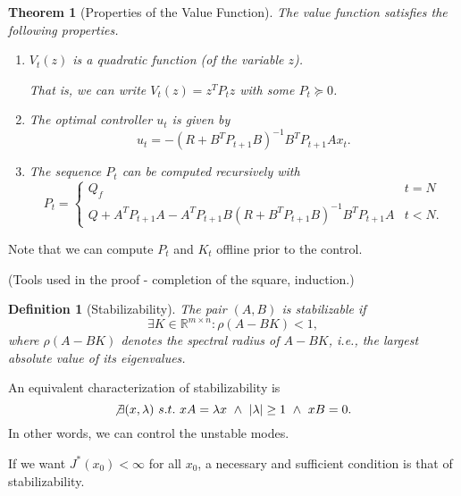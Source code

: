 \documentclass[a4 paper]{article}
\numberwithin{equation}{section}
\theoremstyle{boldStyle}
\theoremstyle{boldBlueStyle}
\theoremstyle{boldPurpleStyle}
\newtheorem{theorem}{Theorem}[section]
\theoremstyle{boldRedStyle}
\newtheorem{definition}{Definition}[section]
\theoremstyle{boldGreenStyle}
\begin{document}
\begin{theorem}[Properties of the Value Function]
The value function satisfies the following properties.
\begin{enumerate}
    \item \( V_t(z) \) is a quadratic function (of the variable \( z \)). 
    
    That is, we can write \( V_t(z) = z^T P_t z \) with some \( P_t \succeq 0 \).
    
    \item The optimal controller \( u_t \) is given by
    \[
    u_t = -(R + B^T P_{t+1} B)^{-1} B^T P_{t+1} A x_t.
    \]
    \item The sequence \( P_t \) can be computed recursively with
    \[
    P_t = 
    \begin{cases} 
    Q_f & t = N \\
    Q + A^T P_{t+1} A - A^T P_{t+1} B (R + B^T P_{t+1} B)^{-1} B^T P_{t+1} A & t < N.
    \end{cases}
    \]
\end{enumerate}
\end{theorem}

Note that we can compute \( P_t \) and \( K_t \) offline prior to the control.

(Tools used in the proof - completion of the square, induction.)


\begin{definition}[Stabilizability]
The pair \( (A, B) \) is \textit{stabilizable} if
\[
\exists K \in \mathbb{R}^{m \times n} : \rho(A - BK) < 1,
\]
where \( \rho(A - BK) \) denotes the spectral radius of \( A - BK \), i.e., the largest absolute value of its eigenvalues.
\end{definition}

An equivalent characterization of stabilizability is
\[
\not\exists (x, \lambda) \ s.t. \ xA = \lambda x \ \land \ |\lambda| \ge 1 \ \land \ xB = 0.
\]
In other words, we can control the unstable modes. 

If we want \( J^*(x_0) < \infty \) for all \( x_0 \), a necessary and sufficient condition is that of stabilizability.
\end{document}
